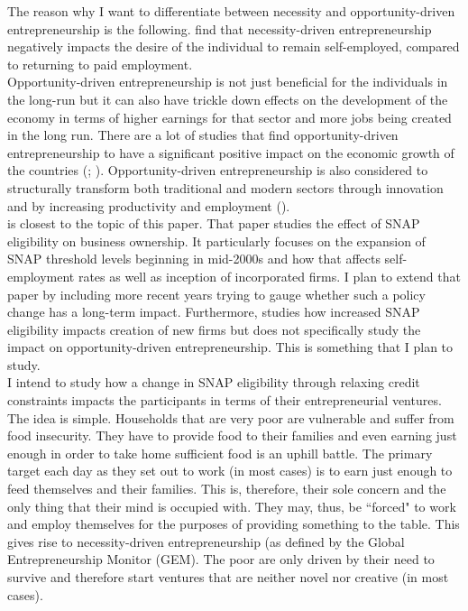 \documentclass[12pt]{article}
\begin{document}
\begin{titlingpage}
The reason why I want to differentiate between necessity and opportunity-driven entrepreneurship is the following. \cite{kautonen2010impact} find that necessity-driven entrepreneurship negatively impacts the desire of the individual to remain self-employed, compared to returning to paid employment.   \\

Opportunity-driven entrepreneurship is not just beneficial for the individuals in the long-run but it can also have trickle down effects on the development of the economy in terms of higher earnings for that sector and more jobs being created in the long run. There are a lot of studies that find opportunity-driven entrepreneurship to have a significant positive impact on the economic growth of the countries (\cite{rodrigues2018impact}; \cite{stoica2020nexus}). Opportunity-driven entrepreneurship is also considered to structurally transform both traditional and modern sectors through innovation and by increasing productivity and employment (\cite{gries2010entrepreneurship}). \\



\cite{olds2016food} is closest to the topic of this paper. That paper studies the effect of SNAP eligibility on business ownership. It particularly focuses on the expansion of SNAP threshold levels beginning in mid-2000s and how that affects self-employment rates as well as inception of incorporated firms. I plan to extend that paper by including more recent years trying to gauge whether such a policy change has a long-term impact. Furthermore, \cite{olds2016food} studies how increased SNAP eligibility impacts creation of new firms but does not specifically study the impact on opportunity-driven entrepreneurship. This is something that I plan to study.  \\

I intend to study how a change in SNAP eligibility through relaxing credit constraints impacts the participants in terms of their entrepreneurial ventures. The idea is simple. Households that are very poor are vulnerable and suffer from food insecurity. They have to provide food to their families and even earning just enough in order to take home sufficient food is an uphill battle. The primary target each day as they set out to work (in most cases) is to earn just enough to feed themselves and their families. This is, therefore, their sole concern and the only thing that their mind is occupied with. They may, thus, be ``forced" to work and employ themselves for the purposes of providing something to the table. This gives rise to necessity-driven entrepreneurship (as defined by the Global Entrepreneurship Monitor (GEM). The poor are only driven by their need to survive and therefore start ventures that are neither novel nor creative (in most cases). \\


\end{titlingpage}
\end{document}
